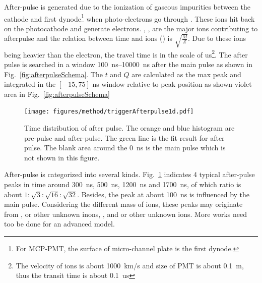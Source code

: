 After-pulse is generated due to the ionization of gaseous impurities between the cathode and first dynode\footnote{For MCP-PMT, the surface of micro-channel plate is the first dynode.} when photo-electrons go through \cite{Coates_1973}. These ions hit back on the photocathode and generate electrons. , ,  are the major ions contributing to afterpulse and the relation between time and ions () is $\sqrt{\frac{M}{Z}}$\cite{Coates_1973}. Due to these ions being heavier than the electron, the travel time is in the scale of \si{us}\footnote{The velocity of ions is about \SI{1000}{km/s} and size of PMT is about \SI{0.1}{m}, thus the transit time is about \SI{0.1}{us}}. The after pulse is searched in a window \SIrange{100}{10000}{ns} after the main pulse as shown in Fig.~\ref{fig:afterpulseSchema}. The $t$ and $Q$ are calculated as the max peak and integrated in the $[-15,75]$ ns window relative to peak position as shown violet area in Fig.~\ref{fig:afterpulseSchema}
\begin{figure}[!htbp]
    \centering
    \texttt{[image: figures/method/triggerAfterpulse1d.pdf]}
    \caption{Time distribution of after pulse. The orange and blue histogram are pre-pulse and after-pulse. The green line is the fit result for after pulse. The blank area around the \SI{0}{ns} is the main pulse which is not shown in this figure.}
    \label{fig:afterpulse1d}
\end{figure}

After-pulse is categorized into several kinds. Fig.~\ref{fig:afterpulse1d} indicates 4 typical after-pulse peaks in time around \SI{300}{ns}, \SI{500}{ns}, \SI{1200}{ns} and \SI{1700}{ns}, of which ratio is about $1:\sqrt{3}:\sqrt{16}:\sqrt{32}$. Besides, the peak at about \SI{100}{ns} is influenced by the main pulse. Considering the different mass of ions, these peaks may originate from ,  or other unknown inons, , and  or other unknown ions. More works need too be done for an advanced model.

